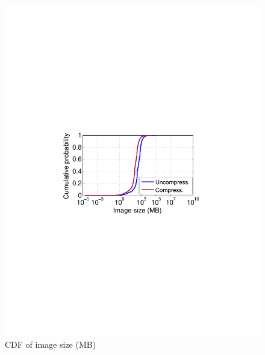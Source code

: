 \begin{figure}[t]
\begin{minipage}{0.22\textwidth}
		\includegraphics[width=1\textwidth]{graphs/image-size-cdf.pdf}
		\caption{CDF of image size (MB)}
		\label{fig:image-size-cdf}
	\end{minipage}%
\end{figure}
